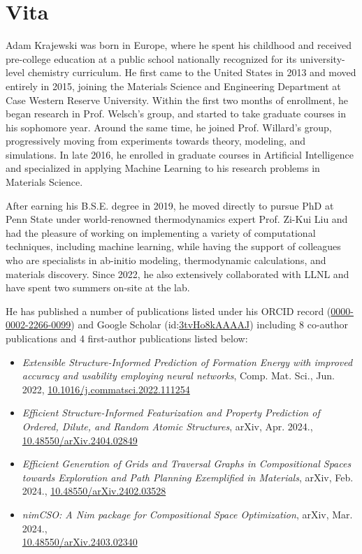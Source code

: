 \documentclass[letterpaper, 12pt]{report}
\begin{document}
\newpage
\chapter*{Vita}
\thispagestyle{empty}

Adam Krajewski was born in Europe, where he spent his childhood and received pre-college education at a public school nationally recognized for its university-level chemistry curriculum. He first came to the United States in 2013 and moved entirely in 2015, joining the Materials Science and Engineering Department at Case Western Reserve University. Within the first two months of enrollment, he began research in Prof. Welsch's group, and started to take graduate courses in his sophomore year. Around the same time, he joined Prof. Willard's group, progressively moving from experiments towards theory, modeling, and simulations. In late 2016, he enrolled in graduate courses in Artificial Intelligence and specialized in applying Machine Learning to his research problems in Materials Science. 

After earning his B.S.E. degree in 2019, he moved directly to pursue PhD at Penn State under world-renowned thermodynamics expert Prof. Zi-Kui Liu and had the pleasure of working on implementing a variety of computational techniques, including machine learning, while having the support of colleagues who are specialists in ab-initio modeling, thermodynamic calculations, and materials discovery. Since 2022, he also extensively collaborated with LLNL and have spent two summers on-site at the lab.

He has published a number of publications listed under his ORCID record (\href{https://orcid.org/0000-0002-2266-0099}{0000-0002-2266-0099}) and Google Scholar (id:\href{https://scholar.google.com/citations?user=3tvHo8kAAAAJ}{3tvHo8kAAAAJ}) including 8 co-author publications and 4 first-author publications listed below:
\begin{itemize}


    \item \textit{Extensible Structure-Informed Prediction of Formation Energy with improved accuracy and usability employing neural networks}, Comp. Mat. Sci., Jun. 2022, \href{https://doi.org/10.1016/j.commatsci.2022.111254}{10.1016/j.commatsci.2022.111254}


    \item \textit{Efficient Structure-Informed Featurization and Property Prediction of Ordered, Dilute, and Random Atomic Structures}, arXiv, Apr. 2024., \href{https://doi.org/10.48550/arXiv.2404.02849}{10.48550/arXiv.2404.02849} 


    \item \textit{Efficient Generation of Grids and Traversal Graphs in Compositional Spaces towards Exploration and Path Planning Exemplified in Materials}, arXiv, Feb. 2024., \href{https://doi.org/10.48550/arXiv.2402.03528}{10.48550/arXiv.2402.03528}

    \item \textit{nimCSO: A Nim
package for Compositional Space Optimization}, arXiv, Mar. 2024.,\\ \href{https://doi.org/10.48550/arXiv.2403.02340}{10.48550/arXiv.2403.02340}
    
\end{itemize}
\end{document}
